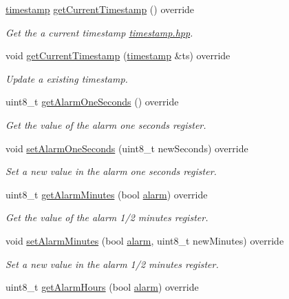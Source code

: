 \begin{DoxyCompactItemize}
\mbox{\hyperlink{classtimestamp}{timestamp}} \mbox{\hyperlink{class_d_s3231_a04e087a918d2d48b0cdd2e3c6c2f595f}{get\+Current\+Timestamp}} () override
\begin{DoxyCompactList}\small\item\em Get the a current timestamp \mbox{\hyperlink{timestamp_8hpp_source}{timestamp.\+hpp}}. \end{DoxyCompactList}\item 
void \mbox{\hyperlink{class_d_s3231_ad94d54ed265fb5b911b4281f0103b0b0}{get\+Current\+Timestamp}} (\mbox{\hyperlink{classtimestamp}{timestamp}} \&ts) override
\begin{DoxyCompactList}\small\item\em Update a existing timestamp. \end{DoxyCompactList}\item 
uint8\+\_\+t \mbox{\hyperlink{class_d_s3231_afd2b16482de8abc10981fdfca0e181a6}{get\+Alarm\+One\+Seconds}} () override
\begin{DoxyCompactList}\small\item\em Get the value of the alarm one seconds register. \end{DoxyCompactList}\item 
void \mbox{\hyperlink{class_d_s3231_ae294f3c8c8634a058846cf9864ccc5c8}{set\+Alarm\+One\+Seconds}} (uint8\+\_\+t new\+Seconds) override
\begin{DoxyCompactList}\small\item\em Set a new value in the alarm one seconds register. \end{DoxyCompactList}\item 
uint8\+\_\+t \mbox{\hyperlink{class_d_s3231_ae11a0dcc34e9c8a9b875989172339957}{get\+Alarm\+Minutes}} (bool \mbox{\hyperlink{classalarm}{alarm}}) override
\begin{DoxyCompactList}\small\item\em Get the value of the alarm 1/2 minutes register. \end{DoxyCompactList}\item 
void \mbox{\hyperlink{class_d_s3231_a9c1f5b183c24f3062c1c8c299f46023c}{set\+Alarm\+Minutes}} (bool \mbox{\hyperlink{classalarm}{alarm}}, uint8\+\_\+t new\+Minutes) override
\begin{DoxyCompactList}\small\item\em Set a new value in the alarm 1/2 minutes register. \end{DoxyCompactList}\item 
uint8\+\_\+t \mbox{\hyperlink{class_d_s3231_a8dc2f4546600209d16f109764c2f4434}{get\+Alarm\+Hours}} (bool \mbox{\hyperlink{classalarm}{alarm}}) override

\end{DoxyCompactItemize}
